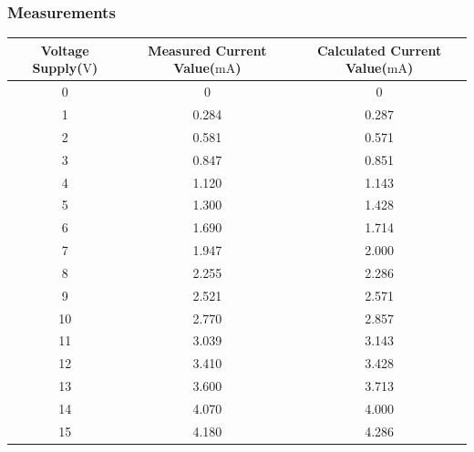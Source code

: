 \documentclass[a4paper]{article}
\begin{document}
\subsubsection{Measurements}
\begin{center}
    \begin{tabular}{|c|c|c|}
        \hline
        Voltage Supply($\si{\volt}$) & Measured Current Value($\si{\milli\ampere}$) & Calculated
        Current Value($\si{\milli\ampere}$)\\\hline
        0&0&0\\\hline
        1&0.284&0.287\\\hline
        2&0.581&0.571\\\hline
        3&0.847&0.851\\\hline
        4&1.120&1.143\\\hline
        5&1.300&1.428\\\hline
        6&1.690&1.714\\\hline
        7&1.947&2.000\\\hline
        8&2.255&2.286\\\hline
        9&2.521&2.571\\\hline
        10&2.770&2.857\\\hline
        11&3.039&3.143\\\hline
        12&3.410&3.428\\\hline
        13&3.600&3.713\\\hline
        14&4.070&4.000\\\hline
        15&4.180&4.286\\\hline
    \end{tabular}
     
\end{center}
\end{document}
